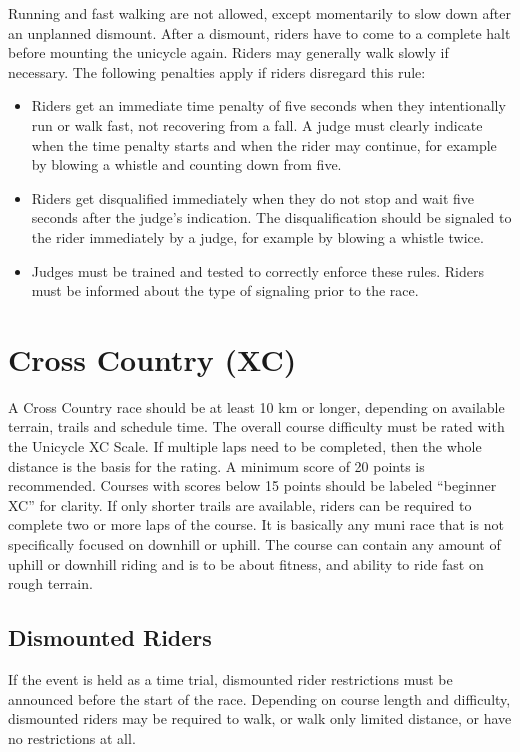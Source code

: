 Running and fast walking are not allowed, except momentarily to slow down after an unplanned dismount.
After a dismount, riders have to come to a complete halt before mounting the unicycle again.
Riders may generally walk slowly if necessary.
The following penalties apply if riders disregard this rule:
\begin{itemize}
\item Riders get an immediate time penalty of five seconds when they intentionally run or walk fast, not recovering from a fall.
A judge must clearly indicate when the time penalty starts and when the rider may continue, for example by blowing a whistle and counting down from five.
\item Riders get disqualified immediately when they do not stop and wait five seconds after the judge's indication.
The disqualification should be signaled to the rider immediately by a judge, for example by blowing a whistle twice.
\item Judges must be trained and tested to correctly enforce these rules.
Riders must be informed about the type of signaling prior to the race.
\end{itemize}

\section{Cross Country (XC)\label{sec:muni_xc}}
A Cross Country race should be at least 10 km or longer, depending on available terrain, trails and schedule time.
The overall course difficulty must be rated with the Unicycle XC Scale.
If multiple laps need to be completed, then the whole distance is the basis for the rating.
A minimum score of  20 points is  recommended. Courses with scores below 15 points should be labeled ``beginner XC'' for clarity.
If only shorter trails are available, riders can be required to complete two or more laps of the course.
It is basically any muni race that is not specifically focused on downhill or uphill.
The course can contain any amount of uphill or downhill riding and is to be about fitness, and ability to ride fast on rough terrain.

\subsection{Dismounted Riders}
If the event is held as a time trial, dismounted rider restrictions must be announced before the start of the race.
Depending on course length and difficulty, dismounted riders may be required to walk, or walk only limited distance, or have no restrictions at all.

